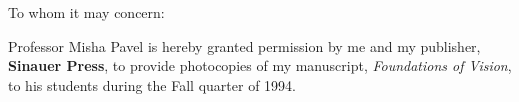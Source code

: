 

\vspace{1.0in}


\mydate

To whom it may concern:

\vspace{1.0in}
Professor Misha Pavel
is hereby granted permission by me and my publisher,
{\bf Sinauer Press}, to provide photocopies of my manuscript,
{\em Foundations of Vision}, to his students during the
Fall quarter of 1994.



